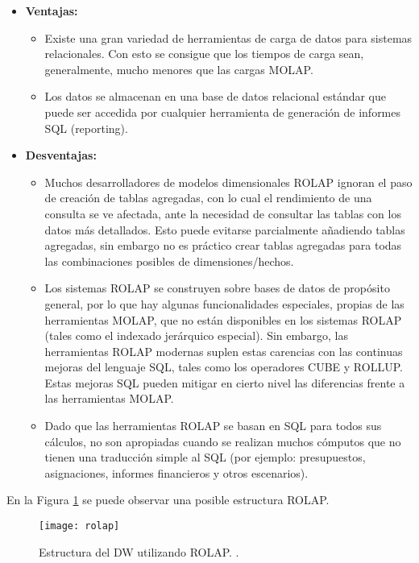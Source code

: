 \documentclass[a4paper,11pt]{article}
\begin{document}
    \begin{itemize}
      \item \textbf{Ventajas:}
        \begin{itemize}
          \item Existe una gran variedad de herramientas de carga de datos para sistemas relacionales. Con esto se consigue que los tiempos de carga
          sean, generalmente, mucho menores que las cargas MOLAP.
          \item Los datos se almacenan en una base de datos relacional estándar que puede ser accedida por cualquier herramienta de generación de
          informes SQL (reporting).
        \end{itemize}
      \item \textbf{Desventajas:}
        \begin{itemize}
          \item Muchos desarrolladores de modelos dimensionales ROLAP ignoran el paso de creación de tablas agregadas, con lo cual el rendimiento de
          una consulta se ve afectada, ante la necesidad de consultar las tablas con los datos más detallados. Esto puede evitarse parcialmente
          añadiendo tablas agregadas, sin embargo no es práctico crear tablas agregadas para todas las combinaciones posibles de dimensiones/hechos.
          \item Los sistemas ROLAP se construyen sobre bases de datos de propósito general, por lo que hay algunas funcionalidades especiales, propias
          de las herramientas MOLAP, que no están disponibles en los sistemas ROLAP (tales como el indexado jerárquico especial). Sin embargo, las
          herramientas ROLAP modernas suplen estas carencias con las continuas mejoras del lenguaje SQL, tales como los operadores CUBE y ROLLUP.
          Estas mejoras SQL pueden mitigar en cierto nivel las diferencias frente a las herramientas MOLAP.
          \item Dado que las herramientas ROLAP se basan en SQL para todos sus cálculos, no son apropiadas cuando se realizan muchos cómputos que
          no tienen una traducción simple al SQL (por ejemplo: presupuestos, asignaciones, informes financieros y otros escenarios).
        \end{itemize}
    \end{itemize}
    
    En la Figura \ref{rolap} se puede observar una posible estructura ROLAP.
    
    \begin{figure}
      \begin{center}
        \texttt{[image: rolap]}
        \caption{Estructura del DW utilizando ROLAP. \cite[p.~81]{nagabhushana}.}
        \label{rolap}
      \end{center}
    \end{figure}
    
\end{document}

